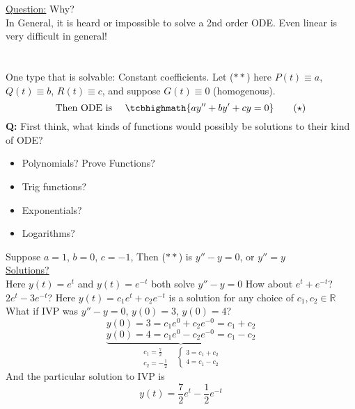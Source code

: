 \underline{Question:} Why?\\
In General, it is heard or impossible to solve a 2nd order ODE. Even linear is very difficult in general!\\
\redhline\\\\
One type that is solvable: Constant coefficients. Let ($\ast \ast$) here $P(t) \equiv a$, $Q(t) \equiv b$, $R(t) \equiv c$, and suppose $G(t) \equiv 0$ (homogenous).
\begin{equation*}
	\text{Then ODE is } \quad \tcbhighmath{ay'' + by' + cy = 0} \tag{$\star$}
\end{equation*}
\textbf{Q: } First think, what kinds of functions would possibly be solutions to their kind of ODE?
\begin{multicols}{2}
	\begin{itemize}
	\item Polynomials? Prove Functions?
	\item Trig functions?
	\item Exponentials?
	\item Logarithms?
	\end{itemize}
\end{multicols}
\begin{example-N}
	Suppose $a =1$, $b = 0$, $c = -1$, Then ($\ast \ast$) is $y'' - y = 0$, or $y'' = y$\\
	\underline{\large Solutions?}\\ Here $y(t) = e^t$ and $y(t) = e^{-t}$ both solve $y'' - y = 0$ How about $e^{t} + e^{-t}$? $2e^t - 3e^{-t}$? Here $y(t) = c_1e^t + c_2e^{-t}$ is a solution for any choice of $c_1, c_2 \in \mathbb{R}$\\
	What if IVP was $y''-y=0$, $y(0)=3$, $y(0) = 4$?
	\begin{equation*}
		y(0) = 3 = c_1 e^0 + c_2 e^{-0} = c_1 + c_2
	\end{equation*}
	\begin{equation*}
		\underbrace{y(0) = 4 = c_1 e^0 - c_2 e^{-0} = c_1 - c_2}_{\begin{split}c_1 = \frac{7}{2}\\ c_2 = -\frac{1}{2} \end{split} \quad \begin{cases}
			3 = c_1 + c_2\\ 4 = c_1 - c_2
		\end{cases}}
	\end{equation*}
	And the particular solution to IVP is 
	\begin{equation*}
		y(t) = \frac{7}{2}e^t - \frac{1}{2} e^{-t}
	\end{equation*}
\end{example-N}
